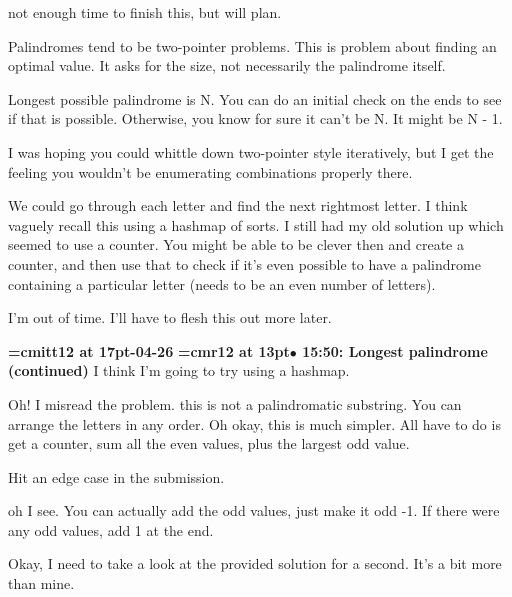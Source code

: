 not enough time to finish this, but will plan.
\par

Palindromes tend to be two-pointer problems. This is problem about finding an optimal value. It asks for the size, not necessarily the palindrome itself.
\par

Longest possible palindrome is N. You can do an initial check on the ends to see if that is possible. Otherwise, you know for sure it can't be N. It might be N - 1.
\par

I was hoping you could whittle down two-pointer style iteratively, but I get the feeling you wouldn't be enumerating combinations properly there.
\par

We could go through each letter and find the next rightmost letter. I think vaguely recall this using a hashmap of sorts. I still had my old solution up which seemed to use a counter. You might be able to be clever then and create a counter, and then use that to check if it's even possible to have a palindrome containing a particular letter (needs to be an even number of letters).
\par

I'm out of time. I'll have to flesh this out more later.
\par

{\medskip\noindent\bf\font\titlefont=cmitt12 at 17pt-04-26}\medskip
{\smallskip\noindent\bf\font\titlefont=cmr12 at 13pt\titlefont $\bullet$ 15:50: Longest palindrome (continued)}\smallskip
I think I'm going to try using a hashmap.
\par

Oh! I misread the problem. this is not a palindromatic substring. You can arrange the letters in any order. Oh okay, this is much simpler. All have to do is get a counter, sum all the even values, plus the largest odd value.
\par

Hit an edge case in the submission.
\par

oh I see. You can actually add the odd values, just make it odd -1. If there were any odd values, add 1 at the end.
\par

Okay, I need to take a look at the provided solution for a second. It's a bit more than mine.
\par


